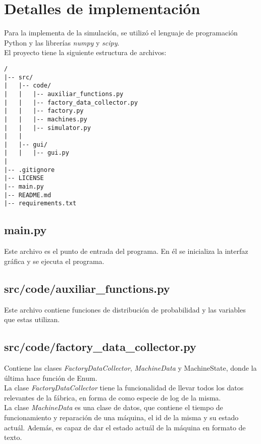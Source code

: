 \documentclass{article}
\begin{document}
\section{Detalles de implementación}

Para la implementa de la simulación, se utilizó el lenguaje de programación Python y las librerías \textit{numpy} y \textit{scipy}.\\

El proyecto tiene la siguiente estructura de archivos:
\begin{verbatim}
/
|-- src/
|   |-- code/
|   |   |-- auxiliar_functions.py
|   |   |-- factory_data_collector.py
|   |   |-- factory.py
|   |   |-- machines.py
|   |   |-- simulator.py
|   |
|   |-- gui/
|   |   |-- gui.py
|
|-- .gitignore
|-- LICENSE
|-- main.py
|-- README.md
|-- requirements.txt
\end{verbatim}

\subsection{main.py}

Este archivo es el punto de entrada del programa. En él se inicializa la interfaz gráfica y se ejecuta el programa.

\subsection{src/code/auxiliar\_functions.py}

Este archivo contiene funciones de distribución de probabilidad y las variables que estas utilizan.

\subsection{src/code/factory\_data\_collector.py}

Contiene las clases \textit{FactoryDataCollector}, \textit{MachineData} y {MachineState}, donde la última hace función de Enum.\\

La clase \textit{FactoryDataCollector} tiene la funcionalidad de llevar todos los datos relevantes de la fábrica, en forma de como especie de log de la misma.\\

La clase \textit{MachineData} es una clase de datos, que contiene el tiempo de funcionamiento y reparación de una máquina, el id de la misma y su estado actuál. Además, es capaz de dar el estado actuál de la máquina en formato de texto.\\
\end{document}
